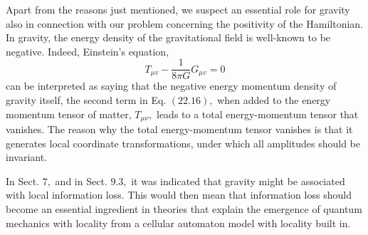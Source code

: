 \documentclass[main.tex]{subfiles}
\begin{document}
Apart from the reasons just mentioned, we suspect an essential role for gravity also in connection with our problem concerning the positivity of the Hamiltonian. In gravity, the energy density of the gravitational field is well-known to be negative. Indeed, Einstein's equation,
$$
T_{\mu v}-\frac{1}{8 \pi G} G_{\mu v}=0
$$
can be interpreted as saying that the negative energy momentum density of gravity itself, the second term in Eq. $(22.16),$ when added to the energy momentum tensor of matter, $T_{\mu \nu},$ leads to a total energy-momentum tensor that vanishes. The reason why the total energy-momentum tensor vanishes is that it generates local coordinate transformations, under which all amplitudes should be invariant.

In Sect. $7,$ and in Sect. $9.3,$ it was indicated that gravity might be associated with local information loss. This would then mean that information loss should become an essential ingredient in theories that explain the emergence of quantum mechanics with locality from a cellular automaton model with locality built in.
\end{document}
